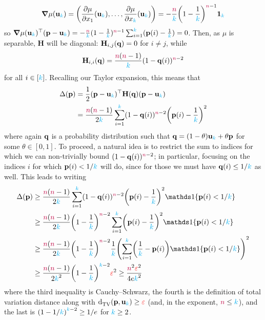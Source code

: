 \[
    \grad{\mu(\uniform_\ab)} = \Paren{\pdv{\mu}{x_1}\-(\uniform_\ab),\dots,\pdv{\mu}{x_\ab}\-(\uniform_\ab) } = -\frac{\ns}{\ab}\Paren{ 1-\frac{1}{\ab} }^{\ns-1} \mathbf{1}_{\ab}
\]
so  
$
\grad{\mu(\ensuremath{\mathbf{u}}_{\textcolor{cyan}{k}})}^\top (\mathbf{p}-\mathbf{u}_{\textcolor{cyan}{k}}) = -\frac{{\textcolor{purple}{n}}}{{\textcolor{cyan}{k}}}(1-\frac{1}{{\textcolor{cyan}{k}}})^{{\textcolor{purple}{n}}-1} \sum_{i=1}^{\textcolor{cyan}{k}} (\mathbf{p}(i)-\frac{1}{{\textcolor{cyan}{k}}}) = 0
$. Then, as $\mu$ is separable, $\mathbf{H}$ will be diagonal: $\mathbf{H}_{i,j}(\mathbf{q}) = 0$ for $i\neq j$, while
\[
    \mathbf{H}_{i,i}(\mathbf{q}) = \frac{{\textcolor{purple}{n}}({\textcolor{purple}{n}}-1)}{{\textcolor{cyan}{k}}}(1-\mathbf{q}(i))^{{\textcolor{purple}{n}}-2}
\]
for all $i\in[{\textcolor{cyan}{k}}]$. Recalling our Taylor expansion, this means that
\begin{align}
    \Delta(\p) 
    &= \frac{1}{2} (\p-\uniform_\ab)^\top \mathbf{H}(\q) (\p-\uniform_\ab) \notag\\
    &= \frac{\ns(\ns-1)}{2\ab}\sum_{i=1}^\ab (1-\q(i))^{\ns-2} \Paren{\p(i)-\frac{1}{\ab}}^2
\end{align}
where again $\mathbf{q}$ is a probability distribution such that $\mathbf{q} = (1-\theta)\mathbf{u}_{\textcolor{cyan}{k}}+\theta\mathbf{p}$ for some $\theta\in[0,1]$. To proceed, a natural idea is to restrict the sum to indices for which we can non-trivially bound $(1-\mathbf{q}(i))^{{\textcolor{purple}{n}}-2}$; in particular, focusing on the indices $i$ for which $\mathbf{p}(i) < 1/{\textcolor{cyan}{k}}$ will do, since for those we must have $\mathbf{q}(i) \leq 1/{\textcolor{cyan}{k}}$ as well. This leads to writing
\begin{align}
    \Delta(\p) 
    &\geq \frac{\ns(\ns-1)}{2\ab}\sum_{i=1}^\ab (1-\q(i))^{\ns-2} \Paren{\p(i)-\frac{1}{\ab}}^2 \indic{\p(i) < 1/\ab} \notag\\
    &\geq \frac{\ns(\ns-1)}{2\ab}\Paren{1-\frac{1}{\ab}}^{\ns-2} \sum_{i=1}^\ab \Paren{\p(i)-\frac{1}{\ab}}^2 \indic{\p(i) < 1/\ab} \notag\\
    &\geq \frac{\ns(\ns-1)}{2\ab}\Paren{1-\frac{1}{\ab}}^{\ns-2} \frac{1}{\ab}\Paren{\sum_{i=1}^\ab \Paren{\frac{1}{\ab}-\p(i)} \indic{\p(i) < 1/\ab}}^2 \notag\\
    &\geq \frac{\ns(\ns-1)}{2\ab^2}\Paren{1-\frac{1}{\ab}}^{\ab-2} \dst^2 
    \geq \frac{\ns^2\dst^2}{4e\ab^2} \label{eq:empirical:expectation:gap}
\end{align}
where the third inequality is Cauchy--Schwarz, the fourth is the definition of total variation distance along with $\totalvardist{\p}{\uniform_\ab}\geq \dst$ (and, in the exponent, ${\textcolor{purple}{n}} \leq {\textcolor{cyan}{k}}$), and the last is $\Paren{1-1/\ab}^{\ab-2} \geq 1/e$ for ${\textcolor{cyan}{k}} \geq 2$.

